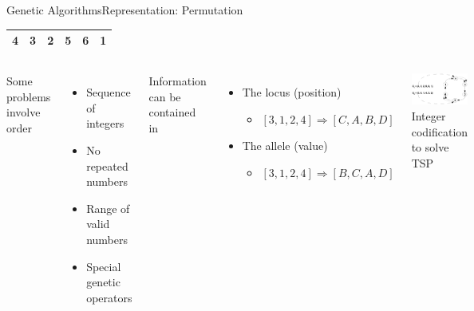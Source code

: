 \documentclass[10pt,compress]{beamer} %
\begin{document}
\begin{frame}{Genetic Algorithms}{Representation: Permutation}
	\vspace{-0.7cm}
	\begin{table}[]
	\centering
	\begin{tabular}{|l|l|l|l|l|l|}
	\hline
 	4 & 3 & 2 & 5 & 6 & 1 \\ \hline
	\end{tabular}
	\end{table}

	\vspace{-0.2cm}

    \begin{columns}
	Some problems involve order
	\begin{itemize}
		\item Sequence of integers
		\item No repeated numbers
		\item Range of valid numbers
		\item Special genetic operators
  	\end{itemize}
	Information can be contained in
	\begin{itemize}
		\item The locus (position)
		\begin{itemize}
		\item[] $[3,1,2,4] \Rightarrow [C,A,B,D]$
		\end{itemize}
		\item The allele (value)
		\begin{itemize}
		\item[] $[3,1,2,4] \Rightarrow [B,C,A,D]$
		\end{itemize}
	\end{itemize}
	\begin{center}
	\includegraphics[width=\linewidth]{figs/codification.eps}\\
	\small{Integer codification to solve TSP}
	\end{center}
	\end{columns}
\end{frame}
\end{document}
